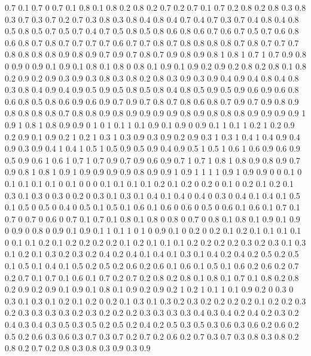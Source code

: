0.7 0.1
0.7 0
0.7 0.1
0.8 0.1
0.8 0.2
0.8 0.2
0.7 0.2
0.7 0.1
0.7 0.2
0.8 0.2
0.8 0.3
0.8 0.3
0.7 0.3
0.7 0.2
0.7 0.3
0.8 0.3
0.8 0.4
0.8 0.4
0.7 0.4
0.7 0.3
0.7 0.4
0.8 0.4
0.8 0.5
0.8 0.5
0.7 0.5
0.7 0.4
0.7 0.5
0.8 0.5
0.8 0.6
0.8 0.6
0.7 0.6
0.7 0.5
0.7 0.6
0.8 0.6
0.8 0.7
0.8 0.7
0.7 0.7
0.7 0.6
0.7 0.7
0.8 0.7
0.8 0.8
0.8 0.8
0.7 0.8
0.7 0.7
0.7 0.8
0.8 0.8
0.8 0.9
0.8 0.9
0.7 0.9
0.7 0.8
0.7 0.9
0.8 0.9
0.8 1
0.8 1
0.7 1
0.7 0.9
0.8 0
0.9 0
0.9 0.1
0.9 0.1
0.8 0.1
0.8 0
0.8 0.1
0.9 0.1
0.9 0.2
0.9 0.2
0.8 0.2
0.8 0.1
0.8 0.2
0.9 0.2
0.9 0.3
0.9 0.3
0.8 0.3
0.8 0.2
0.8 0.3
0.9 0.3
0.9 0.4
0.9 0.4
0.8 0.4
0.8 0.3
0.8 0.4
0.9 0.4
0.9 0.5
0.9 0.5
0.8 0.5
0.8 0.4
0.8 0.5
0.9 0.5
0.9 0.6
0.9 0.6
0.8 0.6
0.8 0.5
0.8 0.6
0.9 0.6
0.9 0.7
0.9 0.7
0.8 0.7
0.8 0.6
0.8 0.7
0.9 0.7
0.9 0.8
0.9 0.8
0.8 0.8
0.8 0.7
0.8 0.8
0.9 0.8
0.9 0.9
0.9 0.9
0.8 0.9
0.8 0.8
0.8 0.9
0.9 0.9
0.9 1
0.9 1
0.8 1
0.8 0.9
0.9 0
1 0
1 0.1
1 0.1
0.9 0.1
0.9 0
0.9 0.1
1 0.1
1 0.2
1 0.2
0.9 0.2
0.9 0.1
0.9 0.2
1 0.2
1 0.3
1 0.3
0.9 0.3
0.9 0.2
0.9 0.3
1 0.3
1 0.4
1 0.4
0.9 0.4
0.9 0.3
0.9 0.4
1 0.4
1 0.5
1 0.5
0.9 0.5
0.9 0.4
0.9 0.5
1 0.5
1 0.6
1 0.6
0.9 0.6
0.9 0.5
0.9 0.6
1 0.6
1 0.7
1 0.7
0.9 0.7
0.9 0.6
0.9 0.7
1 0.7
1 0.8
1 0.8
0.9 0.8
0.9 0.7
0.9 0.8
1 0.8
1 0.9
1 0.9
0.9 0.9
0.9 0.8
0.9 0.9
1 0.9
1 1
1 1
0.9 1
0.9 0.9
0 0
0.1 0
0.1 0.1
0.1 0.1
0 0.1
0 0
0 0.1
0.1 0.1
0.1 0.2
0.1 0.2
0 0.2
0 0.1
0 0.2
0.1 0.2
0.1 0.3
0.1 0.3
0 0.3
0 0.2
0 0.3
0.1 0.3
0.1 0.4
0.1 0.4
0 0.4
0 0.3
0 0.4
0.1 0.4
0.1 0.5
0.1 0.5
0 0.5
0 0.4
0 0.5
0.1 0.5
0.1 0.6
0.1 0.6
0 0.6
0 0.5
0 0.6
0.1 0.6
0.1 0.7
0.1 0.7
0 0.7
0 0.6
0 0.7
0.1 0.7
0.1 0.8
0.1 0.8
0 0.8
0 0.7
0 0.8
0.1 0.8
0.1 0.9
0.1 0.9
0 0.9
0 0.8
0 0.9
0.1 0.9
0.1 1
0.1 1
0 1
0 0.9
0.1 0
0.2 0
0.2 0.1
0.2 0.1
0.1 0.1
0.1 0
0.1 0.1
0.2 0.1
0.2 0.2
0.2 0.2
0.1 0.2
0.1 0.1
0.1 0.2
0.2 0.2
0.2 0.3
0.2 0.3
0.1 0.3
0.1 0.2
0.1 0.3
0.2 0.3
0.2 0.4
0.2 0.4
0.1 0.4
0.1 0.3
0.1 0.4
0.2 0.4
0.2 0.5
0.2 0.5
0.1 0.5
0.1 0.4
0.1 0.5
0.2 0.5
0.2 0.6
0.2 0.6
0.1 0.6
0.1 0.5
0.1 0.6
0.2 0.6
0.2 0.7
0.2 0.7
0.1 0.7
0.1 0.6
0.1 0.7
0.2 0.7
0.2 0.8
0.2 0.8
0.1 0.8
0.1 0.7
0.1 0.8
0.2 0.8
0.2 0.9
0.2 0.9
0.1 0.9
0.1 0.8
0.1 0.9
0.2 0.9
0.2 1
0.2 1
0.1 1
0.1 0.9
0.2 0
0.3 0
0.3 0.1
0.3 0.1
0.2 0.1
0.2 0
0.2 0.1
0.3 0.1
0.3 0.2
0.3 0.2
0.2 0.2
0.2 0.1
0.2 0.2
0.3 0.2
0.3 0.3
0.3 0.3
0.2 0.3
0.2 0.2
0.2 0.3
0.3 0.3
0.3 0.4
0.3 0.4
0.2 0.4
0.2 0.3
0.2 0.4
0.3 0.4
0.3 0.5
0.3 0.5
0.2 0.5
0.2 0.4
0.2 0.5
0.3 0.5
0.3 0.6
0.3 0.6
0.2 0.6
0.2 0.5
0.2 0.6
0.3 0.6
0.3 0.7
0.3 0.7
0.2 0.7
0.2 0.6
0.2 0.7
0.3 0.7
0.3 0.8
0.3 0.8
0.2 0.8
0.2 0.7
0.2 0.8
0.3 0.8
0.3 0.9
0.3 0.9
